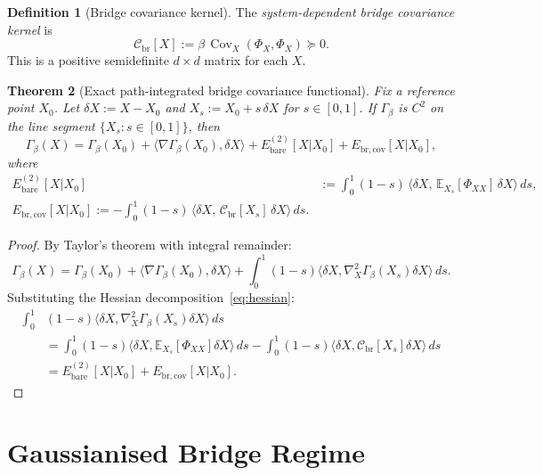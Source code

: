 \documentclass[12pt]{article}
\theoremstyle{plain}
\newtheorem{theorem}{Theorem}[section]
\theoremstyle{definition}
\newtheorem{definition}[theorem]{Definition}
\numberwithin{equation}{section}
\newcommand{\br}{\mathrm{br}}
\DeclareMathOperator{\Cov}{Cov}
\begin{document}
\begin{definition}[Bridge covariance kernel]\label{def:Cbr}
The \emph{system-dependent bridge covariance kernel} is
\begin{equation}\label{eq:Cbr}
\boxed{\mathcal{C}_{\br}[X]
:= \beta\,\Cov_X(\Phi_X,\Phi_X) \succeq 0.}
\end{equation}
This is a positive semidefinite $d\times d$ matrix for each $X$.
\end{definition}

\begin{theorem}[Exact path-integrated bridge covariance functional]\label{thm:functional}
Fix a reference point $X_0$.  Let $\delta X:=X-X_0$ and
$X_s:=X_0+s\,\delta X$ for $s\in[0,1]$.  If $\Gamma_\beta$ is
$C^2$ on the line segment $\{X_s:s\in[0,1]\}$, then
\begin{equation}
\Gamma_\beta(X) = \Gamma_\beta(X_0)
+ \langle\nabla\Gamma_\beta(X_0),\delta X\rangle
+ E_{\mathrm{bare}}^{(2)}[X|X_0]
+ E_{\br,\mathrm{cov}}[X|X_0],
\end{equation}
where
\begin{align}
E_{\mathrm{bare}}^{(2)}[X|X_0]
&:= \int_0^1(1-s)\,
\langle\delta X,\,\mathbb{E}_{X_s}[\Phi_{XX}]\,\delta X\rangle\,ds,\\
\boxed{E_{\br,\mathrm{cov}}[X|X_0]
:= -\int_0^1(1-s)\,
\langle\delta X,\,\mathcal{C}_{\br}[X_s]\,\delta X\rangle\,ds.}
\end{align}
\end{theorem}

\begin{proof}
By Taylor's theorem with integral remainder:
\begin{equation}
\Gamma_\beta(X) = \Gamma_\beta(X_0)
+\langle\nabla\Gamma_\beta(X_0),\delta X\rangle
+\int_0^1(1-s)\langle\delta X,
\nabla_X^2\Gamma_\beta(X_s)\delta X\rangle\,ds.
\end{equation}
Substituting the Hessian decomposition~\eqref{eq:hessian}:
\begin{align}
\int_0^1&(1-s)\langle\delta X,
\nabla_X^2\Gamma_\beta(X_s)\delta X\rangle\,ds\\
&= \int_0^1(1-s)\langle\delta X,
\mathbb{E}_{X_s}[\Phi_{XX}]\delta X\rangle\,ds
-\int_0^1(1-s)\langle\delta X,
\mathcal{C}_{\br}[X_s]\delta X\rangle\,ds\\
&= E_{\mathrm{bare}}^{(2)}[X|X_0]
+ E_{\br,\mathrm{cov}}[X|X_0].
\end{align}
\end{proof}


\section{Gaussianised Bridge Regime}\label{sec:gaussian}
\end{document}
